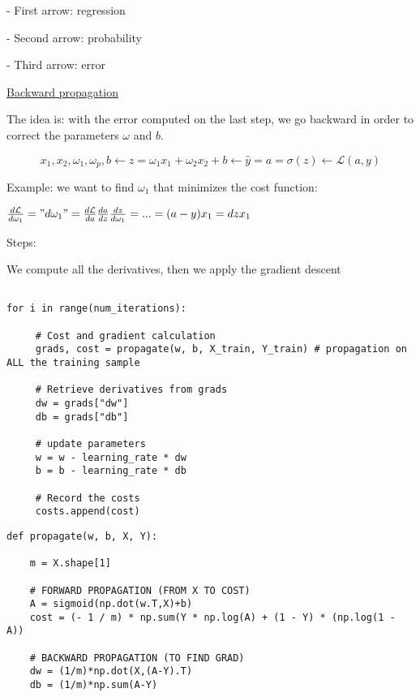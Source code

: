 - First arrow: regression

- Second arrow: probability

- Third arrow: error

\vspace{5mm}

\underline{Backward propagation}

The idea is: with the error computed on the last step, we go backward in order to correct the parameters $\omega$ and $b$.

$$x_1,x_2, \omega_1,\omega_p,b \leftarrow z=\omega_1x_1 + \omega_2x_2 + b \leftarrow \widehat{y}=a=\sigma(z) \leftarrow \mathcal{L}(a,y)$$

Example: we want to find $\omega_1$ that minimizes the cost function:

$\frac{d\mathcal{L}}{d\omega_1}="d\omega_1"=\frac{d\mathcal{L}}{da}\frac{da}{dz}\frac{dz}{d\omega_1}=...=(a-y)x_1=dzx_1$

Steps:

We compute all the derivatives, then we apply the gradient descent

\lstset{language=Python}
\lstset{frame=lines}
\lstset{basicstyle=\footnotesize}
\begin{lstlisting}

for i in range(num_iterations):
        
     # Cost and gradient calculation
     grads, cost = propagate(w, b, X_train, Y_train) # propagation on ALL the training sample
        
     # Retrieve derivatives from grads
     dw = grads["dw"]
     db = grads["db"]
        
     # update parameters
     w = w - learning_rate * dw
     b = b - learning_rate * db
        
     # Record the costs
     costs.append(cost)

\end{lstlisting}

\lstset{language=Python}
\lstset{frame=lines}
\lstset{basicstyle=\footnotesize}
\begin{lstlisting}
def propagate(w, b, X, Y):
    
    m = X.shape[1]
    
    # FORWARD PROPAGATION (FROM X TO COST)
    A = sigmoid(np.dot(w.T,X)+b)
    cost = (- 1 / m) * np.sum(Y * np.log(A) + (1 - Y) * (np.log(1 - A))
    
    # BACKWARD PROPAGATION (TO FIND GRAD)
    dw = (1/m)*np.dot(X,(A-Y).T)
    db = (1/m)*np.sum(A-Y)

\end{lstlisting}



\vspace{5mm}